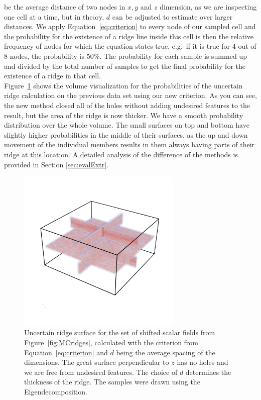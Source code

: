 be the average distance of two nodes in $x, y$ and $z$ dimension, as we
are inspecting one cell at a time, but in theory, $d$ can be adjusted to
estimate over larger distances. We apply Equation~\ref{eq:criterion} to
every node of our sampled cell and the probability for the existence of
a ridge line inside this cell is then the relative frequency of nodes
for which the equation states true, e.g.\, if it is true for 4 out of 8
nodes, the probability is $50\%$. The probability for each sample is
summed up and divided by the total number of samples to get the final
probability for the existence of a ridge in that cell.\\
\indent Figure~\ref{fig:newmethod} shows the volume visualization for
the probabilities of the uncertain ridge calculation on the previous
data set using our new criterion. As you can see, the new method closed
all of the holes without adding undesired features to the result, but
the area of the ridge is now thicker. We have a smooth probability
distribution over the whole volume. The small surfaces on top and bottom
have slightly higher probabilities in the middle of their surfaces, as
the up and down movement of the individual members results in them
always having parts of their ridge at this location. A detailed analysis
of the difference of the methods is provided in Section
\ref{sec:evalExtr}.

\begin{figure}[t]
    \centering
    \includegraphics[trim=0 350 0 300, clip=true, width=0.7\textwidth]{Images/lowuncnew.png}
    \caption{Uncertain ridge surface for the set of shifted scalar
    fields from Figure~\ref{fig:MCridges}, calculated with the criterion
    from Equation~\ref{eq:criterion} and $d$ being the average spacing
    of the dimensions. The great surface perpendicular to $z$ has no
    holes and we are free from undesired features. The choice of $d$
    determines the thickness of the ridge. The samples were drawn using
    the Eigendecomposition.}
    \label{fig:newmethod}
\end{figure}

